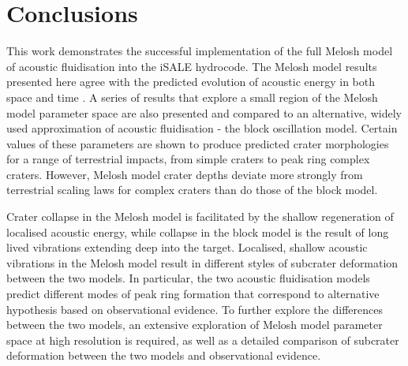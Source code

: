 \section{Conclusions}

This work demonstrates the successful implementation of the full Melosh model of acoustic fluidisation into the iSALE hydrocode. The Melosh model results presented here agree with the predicted evolution of acoustic energy in both space and time \citep{melosh1979acoustic}. A series of results that explore a small region of the Melosh model parameter space are also presented and compared to an alternative, widely used approximation of acoustic fluidisation - the block oscillation model. Certain values of these parameters are shown to produce predicted crater morphologies for a range of terrestrial impacts, from simple craters to peak ring complex craters. However, Melosh model crater depths deviate more strongly from terrestrial scaling laws for complex craters than do those of the block model.

Crater collapse in the Melosh model is facilitated by the shallow regeneration of localised acoustic energy, while collapse in the block model is the result of long lived vibrations extending deep into the target. Localised, shallow acoustic vibrations in the Melosh model result in different styles of subcrater deformation between the two models. In particular, the two acoustic fluidisation models predict different modes of peak ring formation that correspond to alternative hypothesis based on observational evidence. To further explore the differences between the two models, an extensive exploration of Melosh model parameter space at high resolution is required, as well as a detailed comparison of subcrater deformation between the two models and observational evidence. 